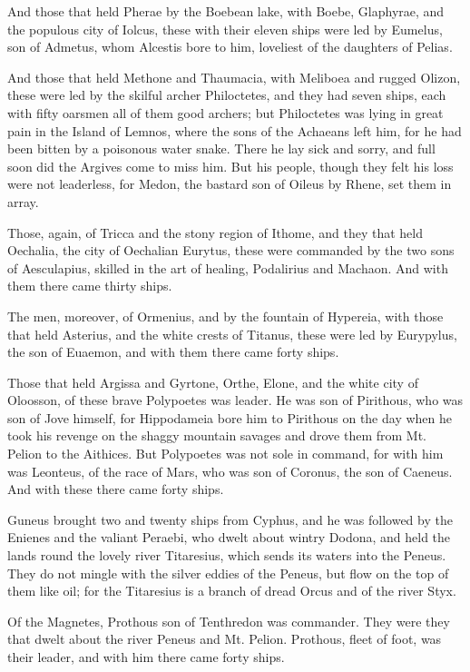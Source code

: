 And those that held Pherae by the Boebean lake, with Boebe, Glaphyrae, and
the populous city of Iolcus, these with their eleven ships were led by
Eumelus, son of Admetus, whom Alcestis bore to him, loveliest of the
daughters of Pelias.

And those that held Methone and Thaumacia, with Meliboea and rugged
Olizon, these were led by the skilful archer Philoctetes, and they had
seven ships, each with fifty oarsmen all of them good archers; but
Philoctetes was lying in great pain in the Island of Lemnos, where the
sons of the Achaeans left him, for he had been bitten by a poisonous water
snake. There he lay sick and sorry, and full soon did the Argives come to
miss him. But his people, though they felt his loss were not leaderless,
for Medon, the bastard son of Oileus by Rhene, set them in array.

Those, again, of Tricca and the stony region of Ithome, and they that held
Oechalia, the city of Oechalian Eurytus, these were commanded by the two
sons of Aesculapius, skilled in the art of healing, Podalirius and
Machaon. And with them there came thirty ships.

The men, moreover, of Ormenius, and by the fountain of Hypereia, with
those that held Asterius, and the white crests of Titanus, these were led
by Eurypylus, the son of Euaemon, and with them there came forty ships.

Those that held Argissa and Gyrtone, Orthe, Elone, and the white city of
Oloosson, of these brave Polypoetes was leader. He was son of Pirithous,
who was son of Jove himself, for Hippodameia bore him to Pirithous on the
day when he took his revenge on the shaggy mountain savages and drove them
from Mt. Pelion to the Aithices. But Polypoetes was not sole in command,
for with him was Leonteus, of the race of Mars, who was son of Coronus,
the son of Caeneus. And with these there came forty ships.

Guneus brought two and twenty ships from Cyphus, and he was followed by
the Enienes and the valiant Peraebi, who dwelt about wintry Dodona, and
held the lands round the lovely river Titaresius, which sends its waters
into the Peneus. They do not mingle with the silver eddies of the Peneus,
but flow on the top of them like oil; for the Titaresius is a branch of
dread Orcus and of the river Styx.

Of the Magnetes, Prothous son of Tenthredon was commander. They were they
that dwelt about the river Peneus and Mt. Pelion. Prothous, fleet of foot,
was their leader, and with him there came forty ships.

